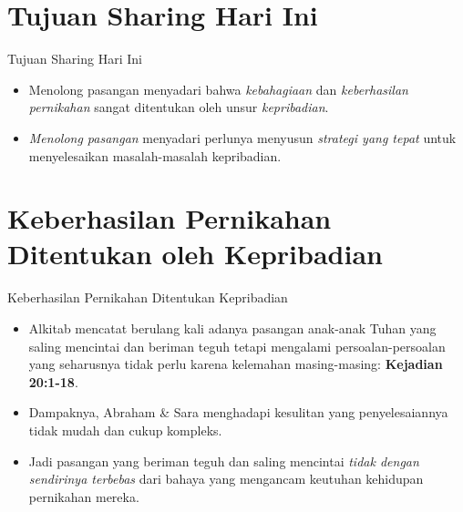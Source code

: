 \documentclass{beamer}
\theoremstyle{mystyle}
\begin{document}
\section{Tujuan Sharing Hari Ini}
\begin{frame}{Tujuan Sharing Hari Ini \citep{susabda2021konseling}}
	\begin{itemize}
		\item<2-> Menolong pasangan menyadari bahwa \textit{kebahagiaan} dan \textit{keberhasilan pernikahan} sangat ditentukan oleh unsur \textit{kepribadian}.
		
		\bigskip
		\item<3-> \textit{Menolong pasangan} menyadari perlunya menyusun \textit{strategi yang tepat} untuk menyelesaikan masalah-masalah kepribadian.
	\end{itemize}
\end{frame}

\section{Keberhasilan Pernikahan Ditentukan oleh Kepribadian}
\begin{frame}{Keberhasilan Pernikahan Ditentukan Kepribadian} 
	\begin{itemize}
		\item<2-> Alkitab mencatat berulang kali adanya pasangan anak-anak Tuhan yang saling mencintai dan beriman teguh tetapi mengalami persoalan-persoalan yang seharusnya tidak perlu karena kelemahan masing-masing: \textbf{Kejadian 20:1-18}.
		\item<3-> Dampaknya, Abraham \& Sara menghadapi kesulitan yang penyelesaiannya tidak mudah dan cukup kompleks.
		\item<4-> Jadi pasangan yang beriman teguh dan saling mencintai \textit{tidak dengan sendirinya terbebas} dari bahaya yang mengancam keutuhan kehidupan pernikahan mereka.		   
	\end{itemize}
\end{frame}
\end{document}
